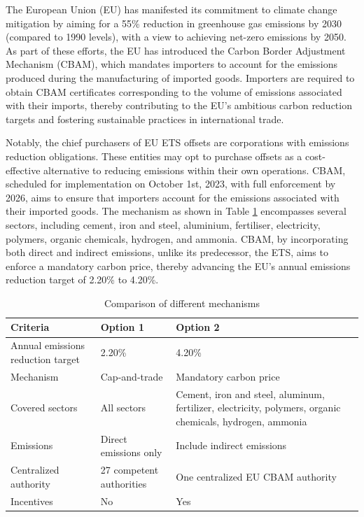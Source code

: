 \documentclass[sigconf, authordraft]{acmart}
\begin{document}
	The European Union (EU) has manifested its commitment to climate change mitigation
	by aiming for a 55\% reduction in greenhouse gas emissions by 2030 (compared to
	1990 levels), with a view to achieving net-zero emissions by 2050. As part of these
	efforts, the EU has introduced the Carbon Border Adjustment Mechanism (CBAM), which
	mandates importers to account for the emissions produced during the manufacturing
	of imported goods. Importers are required to obtain CBAM certificates
	corresponding to the volume of emissions associated with their imports, thereby
	contributing to the EU's ambitious carbon reduction targets and fostering sustainable
	practices in international trade.

	Notably, the chief purchasers of EU ETS offsets are corporations with
	emissions reduction obligations. These entities may opt to purchase offsets as
	a cost-effective alternative to reducing emissions within their own operations.
	CBAM, scheduled for implementation on October 1st, 2023, with full enforcement
	by 2026, aims to ensure that importers account for the emissions associated
	with their imported goods. The mechanism as shown in Table \ref{tab:comparison_of_different_mechanisms}
	encompasses several sectors, including cement, iron and steel, aluminium, fertiliser,
	electricity, polymers, organic chemicals, hydrogen, and ammonia. CBAM, by
	incorporating both direct and indirect emissions, unlike its predecessor, the
	ETS, aims to enforce a mandatory carbon price, thereby advancing the EU's
	annual emissions reduction target of 2.20\% to 4.20\%.

	\begin{table}[h]
		\caption{Comparison of different mechanisms}
		\begin{tabularx}
			{\linewidth}{|X|X|X|} \hline \textbf{Criteria} & \textbf{Option 1} &
			\textbf{Option 2} \\ \hline Annual emissions reduction target & 2.20\% &
			4.20\% \\ \hline Mechanism & Cap-and-trade & Mandatory carbon price \\ \hline
			Covered sectors & All sectors & Cement, iron and steel, aluminum,
			fertilizer, electricity, polymers, organic chemicals, hydrogen, ammonia \\
			\hline Emissions & Direct emissions only & Include indirect emissions \\ \hline
			Centralized authority & 27 competent authorities & One centralized EU CBAM
			authority \\ \hline Incentives & No & Yes \\ \hline
		\end{tabularx}
		\label{tab:comparison_of_different_mechanisms}
	\end{table}
\end{document}
